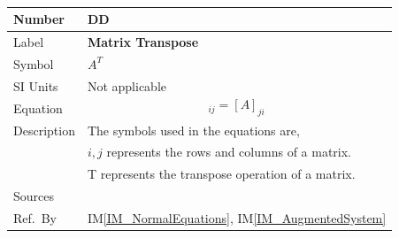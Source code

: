 \documentclass[12pt]{article}
\newcommand{\colAwidth}{0.13\textwidth}
\newcommand{\colBwidth}{0.82\textwidth}
\newcounter{defnum} %
\newcounter{datadefnum} %
\newcommand{\iref}[1]{IM\ref{#1}}
\begin{document}
~\newline
\noindent
\begin{minipage}{\textwidth}
	\renewcommand*{\arraystretch}{1.5}
	\begin{tabular}{| p{\colAwidth} | p{\colBwidth}|}
		\hline
		\rowcolor[gray]{0.9}
		Number
		& DD{datadefnum}\thedatadefnum \label{DD_MatrixTranspose}\\
		\hline
		
		Label
		& \bf Matrix Transpose\\
		\hline
		
		Symbol 
		&$A^{T}$\\
		\hline
		
		SI Units 
		& Not applicable\\
		\hline
		
		Equation
		&
		\begin{equation*}
		[A^{T}]_{ij} = [A]_{ji}
		\end{equation*}\\
		\hline
		
		Description 
		&The symbols used in the equations are,\\ 
		& $i, j$ represents the rows and columns of a matrix.\\
		& T represents the transpose operation of a matrix.\\
		
		\hline
		
		Sources
		& ~\cite{Health1997}\\
		\hline
		
		Ref.\ By 
		& \iref{IM_NormalEquations}, \iref{IM_AugmentedSystem}\\
		\hline
		
	\end{tabular}
\end{minipage}\\
  
\end{document}
